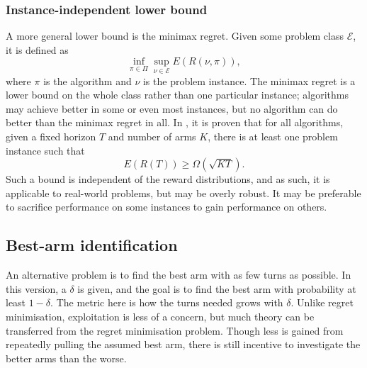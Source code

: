 \subsubsection{Instance-independent lower bound}
A more general lower bound is the minimax regret.
Given some problem class $\mathcal{E}$, it is defined as
\begin{equation}
    \inf_{\pi \in \Pi} \sup_{\nu \in \mathcal{E}} E(R(\nu, \pi)),
\end{equation}
where $\pi$ is the algorithm and $\nu$ is the problem instance.
The minimax regret is a lower bound on the whole class rather than one particular instance; algorithms may achieve better in some or even most instances, but no algorithm can do better than the minimax regret in all.
In \cite{lattimore2020}, it is proven that for all algorithms, given a fixed horizon $T$ and number of arms $K$, there is at least one problem instance such that
\begin{equation}
    E(R(T)) \geq \Omega(\sqrt{KT}).
\end{equation}
Such a bound is independent of the reward distributions, and as such, it is applicable to real-world problems, but may be overly robust.
It may be preferable to sacrifice performance on some instances to gain performance on others.


\subsection{Best-arm identification}
An alternative problem is to find the best arm with as few turns as possible.
In this version, a $\delta$ is given, and the goal is to find the best arm with probability at least $1-\delta$.
The metric here is how the turns needed grows with $\delta$.
Unlike regret minimisation, exploitation is less of a concern, but much theory can be transferred from the regret minimisation problem.
Though less is gained from repeatedly pulling the assumed best arm, there is still incentive to investigate the better arms than the worse.

